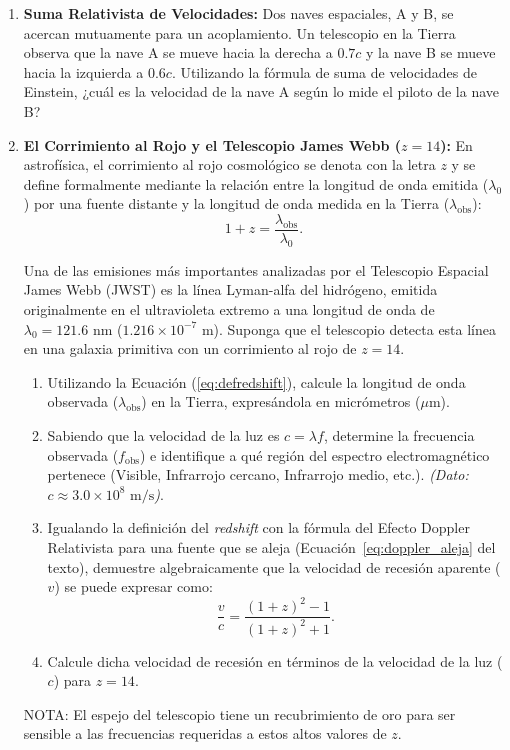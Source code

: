\documentclass[11pt,a4paper]{book}
\begin{document}
\begin{enumerate}
    \item \textbf{Suma Relativista de Velocidades:} Dos naves espaciales, A y B, se acercan mutuamente para un acoplamiento. Un telescopio en la Tierra observa que la nave A se mueve hacia la derecha a $0.7c$ y la nave B se mueve hacia la izquierda a $0.6c$. Utilizando la fórmula de suma de velocidades de Einstein, ¿cuál es la velocidad de la nave A según lo mide el piloto de la nave B?

    \item \textbf{El Corrimiento al Rojo y el Telescopio James Webb ($z = 14$):} 
    En astrofísica, el corrimiento al rojo cosmológico se denota con la letra $z$ y se define formalmente mediante la relación entre la longitud de onda emitida ($\lambda_0$) por una fuente distante y la longitud de onda medida en la Tierra ($\lambda_{\text{obs}}$):
    \begin{equation}
        1 + z = \frac{\lambda_{\text{obs}}}{\lambda_0}.
        \label{eq:defredshift}
    \end{equation}
    \label{item:redshift}
    
    Una de las emisiones más importantes analizadas por el Telescopio Espacial James Webb (JWST) es la línea Lyman-alfa del hidrógeno, emitida originalmente en el ultravioleta extremo a una longitud de onda de $\lambda_0 = 121.6 \text{ nm}$ ($1.216 \times 10^{-7} \text{ m}$). Suponga que el telescopio detecta esta línea en una galaxia primitiva con un corrimiento al rojo de $z = 14$.
    
    \begin{enumerate}
        \item[a)] Utilizando la Ecuación (\ref{eq:defredshift}), calcule la longitud de onda observada ($\lambda_{\text{obs}}$) en la Tierra, expresándola en micrómetros ($\mu\text{m}$).
        \item[b)] Sabiendo que la velocidad de la luz es $c = \lambda f$, determine la frecuencia observada ($f_{\text{obs}}$) e identifique a qué región del espectro electromagnético pertenece (Visible, Infrarrojo cercano, Infrarrojo medio, etc.). \textit{(Dato: $c \approx 3.0 \times 10^8 \text{ m/s}$)}.
        \item[c)] Igualando la definición del \textit{redshift} con la fórmula del Efecto Doppler Relativista para una fuente que se aleja (Ecuación~\eqref{eq:doppler_aleja} del texto), demuestre algebraicamente que la velocidad de recesión aparente ($v$) se puede expresar como:
        \begin{equation}
            \frac{v}{c} = \frac{(1 + z)^2 - 1}{(1 + z)^2 + 1}.
        \end{equation}
        \item[d)] Calcule dicha velocidad de recesión en términos de la velocidad de la luz ($c$) para $z = 14$.
    \end{enumerate}
    NOTA: El espejo del telescopio tiene un recubrimiento de oro para ser sensible a las frecuencias requeridas a estos altos valores de $z$.


\end{enumerate}
\end{document}
